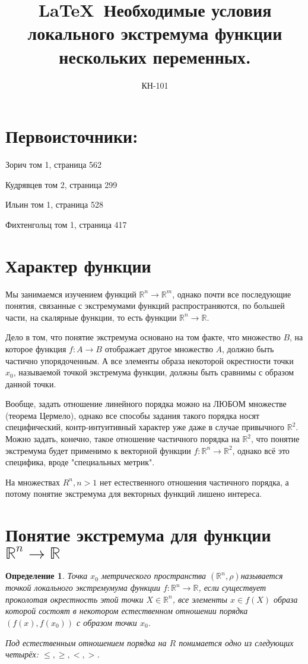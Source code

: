 \documentclass[20pt,a4paper]{extarticle}
\title{\LaTeX\ Необходимые условия локального экстремума функции нескольких переменных.}
\author{КН-101}
\newtheorem*{definition}{Определение}
\newenvironment{ftdef}
  {\begin{mdframed}\begin{definition}}
  {\end{definition}\end{mdframed}}
\begin{document}
\maketitle

\section*{Первоисточники:}
\parindent=0cm
Зорич том 1, страница 562

Кудрявцев том 2, страница 299

Ильин том 1, страница 528

Фихтенгольц том 1, страница 417

\section{Характер функции}
\parindent=1cm
Мы занимаемся изучением функций $\mathbb{R}^n \to \mathbb{R}^m$, однако почти все последующие понятия, связанные с экстремумами функций распространяются, по большей части, на скалярные функции, то есть функции $\mathbb{R}^n \to \mathbb{R}$.

Дело в том, что понятие экстремума основано на том факте, что множество $B$, на которое функция $f: A \to B$ отображает другое множество $A$, должно быть частично упорядоченным. А все элементы образа некоторой окрестности точки $x_0$, называемой точкой экстремума функции, должны быть сравнимы с образом данной точки.

Вообще, задать отношение линейного порядка можно на ЛЮБОМ множестве (теорема Цермело), однако все способы задания такого порядка носят специфический, контр-интуитивный характер уже даже в случае привычного $\mathbb{R}^2$. Можно задать, конечно, такое отношение частичного порядка на $\mathbb{R}^2$, что понятие экстремума будет применимо к векторной функции $f: \mathbb{R}^n \to \mathbb{R}^2$, однако всё это специфика, вроде "специальных метрик". 

На множествах $R^n, n>1$ нет естественного отношения частичного порядка, а потому понятие экстремума для векторных функций лишено интереса.
\section{Понятие экстремума для функции\linebreak $\mathbb{R}^n \to \mathbb{R}$}
\begin{ftdef}
Точка $x_0$ метрического пространства $(\mathbb{R}^n, \rho)$\linebreak называется точкой локального экстремумума функции $f: \mathbb{R}^n \to \mathbb{R}$, если существует проколотая окрестность этой точки $X \in \mathbb{R}^n$, все элементы $x \in f(X)$ образа которой состоят в некотором естественном отношении порядка\linebreak $(f(x), f(x_0))$ с образом точки $x_0$.

Под естественным отношением порядка на $R$ понимается одно из следующих четырёх: $\leq, \geq, <, >$.
\end{ftdef}
\end{document}
